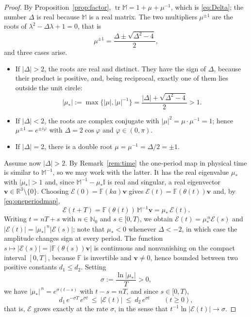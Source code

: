 \documentclass[reqno]{amsart}
\newcommand{\F}{\mathbb{F}}
\newcommand{\tr}{\operatorname{tr}}     %
\begin{document}
\begin{proof}
By Proposition~\ref{prop:factor}, $\tr\mathbb M=1+\mu+\mu^{-1}$, which is \eqref{eq:Delta}; the number $\Delta$ is real because $\mathbb M$ is a real matrix. The two multipliers $\mu^{\pm1}$ are the roots of $\lambda^2-\Delta\lambda+1=0$, that is
\begin{equation}\label{eq:quad}
\mu^{\pm 1}=\frac{\Delta\pm\sqrt{\Delta^2-4}}{2},
\end{equation}
and three cases arise.
\begin{itemize}
\item If $|\Delta|>2$, the roots are real and distinct. They have the sign of $\Delta$, because their product is positive, and, being reciprocal, exactly one of them lies outside the unit circle:
\[
|\mu_*|:=\max\{|\mu|,|\mu|^{-1}\}=\frac{|\Delta|+\sqrt{\Delta^2-4}}{2}>1 .
\]
\item If $|\Delta|<2$, the roots are complex conjugate with $|\mu|^2=\mu\cdot\mu^{-1}=1$; hence $\mu^{\pm1}=e^{\pm i\varphi}$ with $\Delta=2\cos\varphi$ and $\varphi\in(0,\pi)$.
\item If $|\Delta|=2$, there is a double root $\mu=\mu^{-1}=\Delta/2=\pm1$.
\end{itemize}

Assume now $|\Delta|>2$. By Remark~\ref{rem:time} the one-period map in physical time is similar to $\mathbb M^{-1}$, so we may work with the latter. It has the real eigenvalue $\mu_*$ with $|\mu_*|>1$ and, since $\mathbb M^{-1}-\mu_*\mathbb I$ is real and singular, a real eigenvector $\mathbf v\in\mathbb R^3\setminus\{0\}$. Choosing $\boldsymbol{\mathcal E}(0)=\F(ka)\mathbf v$ gives $\boldsymbol{\mathcal E}(t)=\F(\theta(t))\mathbf v$ and, by \eqref{eq:oneperiodmap},
\[
\boldsymbol{\mathcal E}(t+T)=\F(\theta(t))\,\mathbb M^{-1}\mathbf v=\mu_*\,\boldsymbol{\mathcal E}(t).
\]
Writing $t=nT+s$ with $n\in\mathbb N_0$ and $s\in[0,T)$, we obtain $\boldsymbol{\mathcal E}(t)=\mu_*^{\,n}\boldsymbol{\mathcal E}(s)$ and $|\boldsymbol{\mathcal E}(t)|=|\mu_*|^{\,n}|\boldsymbol{\mathcal E}(s)|$; note that $\mu_*<0$ whenever $\Delta<-2$, in which case the amplitude changes sign at every period. The function $s\mapsto|\boldsymbol{\mathcal E}(s)|=|\F(\theta(s))\mathbf v|$ is continuous and nonvanishing on the compact interval $[0,T]$, because $\F$ is invertible and $\mathbf v\neq0$, hence bounded between two positive constants $d_1\le d_2$. Setting
\[
\sigma:=\frac{\ln|\mu_*|}{T}>0,
\]
we have $|\mu_*|^{\,n}=e^{\sigma(t-s)}$ with $t-s=nT$, and since $s\in[0,T)$,
\[
d_1\,e^{-\sigma T}\,e^{\sigma t}\ \le\ |\boldsymbol{\mathcal E}(t)|\ \le\ d_2\,e^{\sigma t}\qquad(t\ge0),
\]
that is, $\boldsymbol{\mathcal E}$ grows exactly at the rate $\sigma$, in the sense that $t^{-1}\ln|\boldsymbol{\mathcal E}(t)|\to\sigma$.


\end{proof}
\end{document}
